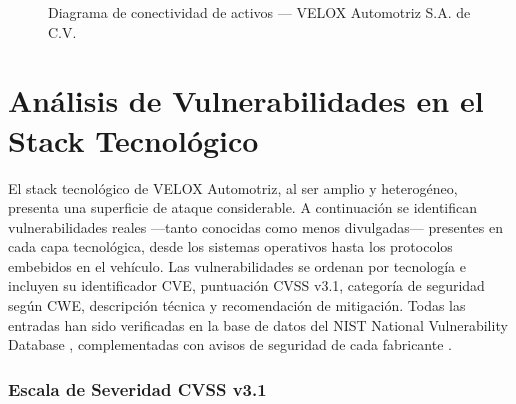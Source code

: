 \documentclass[letterpaper,11pt]{article}
\begin{document}
\begin{figure}[H]
\caption{Diagrama de conectividad de activos --- VELOX Automotriz S.A. de C.V.}
\label{fig:red-velox}
\end{figure}

\newpage
\section{Análisis de Vulnerabilidades en el Stack Tecnológico}

El stack tecnológico de VELOX Automotriz, al ser amplio y heterogéneo, presenta una superficie de ataque considerable. A continuación se identifican vulnerabilidades reales ---tanto conocidas como menos divulgadas--- presentes en cada capa tecnológica, desde los sistemas operativos hasta los protocolos embebidos en el vehículo. Las vulnerabilidades se ordenan por tecnología e incluyen su identificador CVE, puntuación CVSS v3.1, categoría de seguridad según CWE, descripción técnica y recomendación de mitigación. Todas las entradas han sido verificadas en la base de datos del NIST National Vulnerability Database \autocite{nvd-nist}, complementadas con avisos de seguridad de cada fabricante \autocite{msrc-advisory, fortinet-psirt-2024, rockwell-advisory-2023, blackberry-badalloc}.

\vspace{0.3cm}

\subsubsection*{Escala de Severidad CVSS v3.1}
\end{document}
